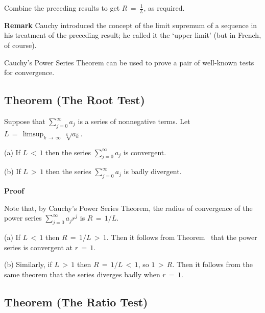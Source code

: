         Combine the preceding results to get ${\displaystyle R \,=\, \frac{1}{L}}$, as required.

\V
\V

        {\bf Remark} Cauchy introduced the concept of the limit supremum of a sequence in his treatment of the preceding result;
    he called it the `upper limit' (but in French, of course).

\V
\V

        Cauchy's Power Series Theorem can be used to prove a pair of well-known tests for convergence.

\V
\V


        \subsection{\small{{\bf Theorem}} (The Root Test)}
        \label{ThmG50.80}

\V

        Suppose that $\sum_{j=0}^{{\infty}} a_{j}$ is a series of nonnegative terms.
    Let ${\displaystyle L \,=\, {\limsup}_{k \,{\rightarrow}\, {\infty}}\, \sqrt[k]{a_{k}}}$.

\V

        (a) If $L\,<\,1$ then the series $\sum_{j=0}^{{\infty}} a_{j}$ is convergent.

\V

        (b) If $L\,>\,1$ then the series $\sum_{j=0}^{{\infty}} a_{j}$ is badly divergent.

\V

        {\bf Proof}

\V

        Note that, by Cauchy's Power Series Theorem,  the radius of convergence of the power series $\sum_{j=0}^{{\infty}} a_{j}r^{j}$ is $R \,=\, 1/L$.

\V


    (a) If $L\,<\,1$ then $R \,=\, 1/L\,>\,1$. Then it follows from Theorem~ that the power series is convergent at $r \,=\, 1$.

\V

        (b) Similarly, if $L\,>\,1$ then $R \,=\, 1/L\,<\,1$, so $1\,>\,R$. Then it follows from the same theorem that the series diverges badly when $r \,=\, 1$.

\V
\V

        \subsection{\small{{\bf Theorem}} (The Ratio Test)}
        \label{ThmG50.90}

